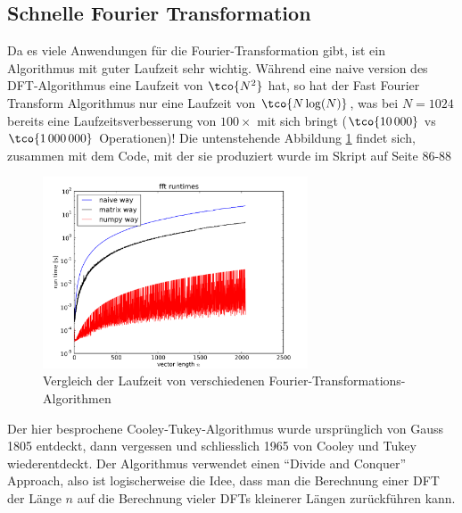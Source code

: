 \newsection
\subsection{Schnelle Fourier Transformation}
Da es viele Anwendungen für die Fourier-Transformation gibt, ist ein Algorithmus mit guter Laufzeit sehr wichtig.
Während eine naive version des DFT-Algorithmus eine Laufzeit von $\tco{N^2}$ hat,
so hat der Fast Fourier Transform Algorithmus nur eine Laufzeit von $\tco{N \log(N)}$,
was bei $N = 1024$ bereits eine Laufzeitsverbesserung von $100\times$ mit sich bringt ($\tco{10\,000}$ vs $\tco{1\,000\,000}$ Operationen)!
Die untenstehende Abbildung \ref{fig:trigo-interp-fft-runtimes} findet sich, zusammen mit dem Code,
mit der sie produziert wurde im Skript auf Seite 86-88

\begin{figure}[h!]
    \begin{center}
        \includegraphics[width=0.7\textwidth]{assets/01_interpolation/01_trigonometric/fft-runtimes.png}
    \end{center}
    \caption{Vergleich der Laufzeit von verschiedenen Fourier-Transformations-Algorithmen}
    \label{fig:trigo-interp-fft-runtimes}
\end{figure}

Der hier besprochene Cooley-Tukey-Algorithmus wurde ursprünglich von Gauss 1805 entdeckt, dann vergessen und schliesslich 1965 von Cooley und Tukey wiederentdeckt.
Der Algorithmus verwendet einen ``Divide and Conquer'' Approach, also ist logischerweise die Idee,
dass man die Berechnung einer DFT der Länge $n$ auf die Berechnung vieler DFTs kleinerer Längen zurückführen kann.

